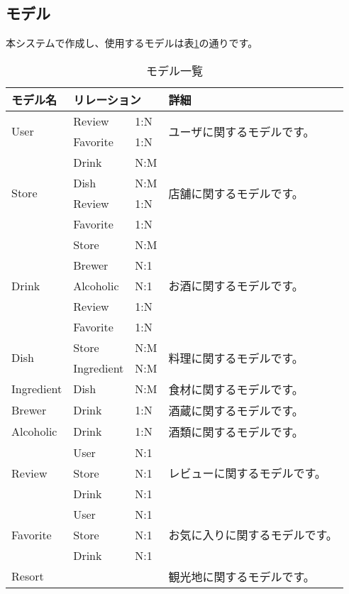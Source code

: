 \documentclass[a4j,titlepage]{jarticle}
\begin{document}
\begin{description}
\section{モデル}

本システムで作成し、使用するモデルは表\ref{model}の通りです。

\begin{table}[!htbp]
\caption{モデル一覧}
\label{model}
\small
\begin{center}
\begin{tabular}{|l|l|l|p{5cm}|}\hline
モデル名 & \multicolumn{2}{|l|}{リレーション} & 詳細 \\\hline\hline
\multirow{2}{*}{User} & Review & 1:N & \multirow{2}{*}{ユーザに関するモデルです。}\\\cline{2-3}
 & Favorite & 1:N & \\\hline
\multirow{4}{*}{Store} & Drink & N:M & \multirow{4}{*}{店舗に関するモデルです。} \\\cline{2-3}
 & Dish & N:M & \\\cline{2-3}
 & Review & 1:N & \\\cline{2-3}
 & Favorite & 1:N & \\\hline
\multirow{5}{*}{Drink} & Store & N:M & \multirow{5}{*}{お酒に関するモデルです。} \\\cline{2-3}
 & Brewer & N:1 & \\\cline{2-3}
 & Alcoholic & N:1 & \\\cline{2-3}
 & Review & 1:N & \\\cline{2-3}
 & Favorite & 1:N & \\\hline
\multirow{2}{*}{Dish} & Store & N:M & \multirow{2}{*}{料理に関するモデルです。} \\\cline{2-3}
 & Ingredient & N:M & \\\hline
Ingredient & Dish & N:M & 食材に関するモデルです。 \\\hline
Brewer & Drink & 1:N & 酒蔵に関するモデルです。 \\\hline
Alcoholic & Drink & 1:N & 酒類に関するモデルです。 \\\hline
\multirow{3}{*}{Review} & User & N:1 & \multirow{3}{*}{レビューに関するモデルです。} \\\cline{2-3}
 & Store & N:1 & \\\cline{2-3}
 & Drink & N:1 & \\\hline
\multirow{3}{*}{Favorite} & User & N:1 & \multirow{3}{*}{お気に入りに関するモデルです。} \\\cline{2-3}
 & Store & N:1 & \\\cline{2-3}
 & Drink & N:1 & \\\hline
Resort & & & 観光地に関するモデルです。 \\\hline
\end{tabular}
\end{center}
\end{table}



\end{description}
\end{document}
